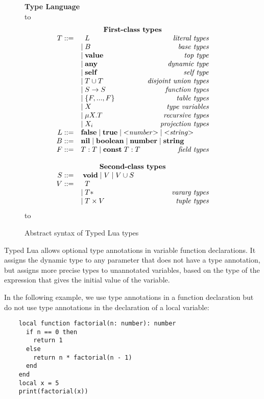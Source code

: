 \documentclass{sig-alternate}
\newcommand{\Any}{\mathbf{any}}
\newcommand{\Top}{\mathbf{value}}
\newcommand{\Nil}{\mathbf{nil}}
\newcommand{\False}{\mathbf{false}}
\newcommand{\True}{\mathbf{true}}
\newcommand{\Boolean}{\mathbf{boolean}}
\newcommand{\Number}{\mathbf{number}}
\newcommand{\String}{\mathbf{string}}
\newcommand{\Void}{\mathbf{void}}
\newcommand{\Const}{\mathbf{const}}
\newcommand{\Self}{\mathbf{self}}
\def\dstart{\hbox to \hsize{\vrule depth 4pt\hrulefill\vrule depth 4pt}}
\def\dend{\hbox to \hsize{\vrule height 4pt\hrulefill\vrule height 4pt}}
\begin{document}
\begin{figure}[!ht]
\textbf{Type Language}\\
\dstart
$$
\begin{array}{rlr}
\multicolumn{3}{c}{\textbf{First-class types}} \\
T ::= & \;\; L & \textit{literal types}\\
& | \; B & \textit{base types}\\
& | \; \Top & \textit{top type}\\
& | \; \Any & \textit{dynamic type}\\
& | \; \Self & \textit{self type}\\
& | \; T \cup T & \textit{disjoint union types}\\
& | \; S \rightarrow S & \textit{function types}\\
& | \; \{F, ..., F\} & \textit{table types}\\
& | \; X & \textit{type variables}\\
& | \; \mu X.T & \textit{recursive types}\\
& | \; X_i & \textit{projection types}\\
L ::= & \multicolumn{2}{l}{\False \; | \; \True \; | \; {<}{\it number}{>} \; | \; {<}{\it string}{>} } \\
B ::= & \multicolumn{2}{l}{\Nil \; | \; \Boolean \; | \; \Number \; | \; \String} \\
F ::= & T:T \; | \; \Const \; T:T & \textit{field types} \\
\multicolumn{3}{c}{} \\
\multicolumn{3}{c}{\textbf{Second-class types}} \\
S ::= &  \multicolumn{2}{l}{\; \Void \; | \; V \; | \; V \cup S} \\
V ::= & \;\; T & \\
& | \; T* & \textit{vararg types}\\
& | \; T \times V & \textit{tuple types}
\end{array}
$$
\dend
\caption{Abstract syntax of Typed Lua types}
\label{fig:typelang}
\end{figure}

Typed Lua allows optional type annotations in variable function
declarations. It assigns the dynamic type to any parameter that
does not have a type annotation, but assigns more precise
types to unannotated variables, based on the type of the
expression that gives the initial value of the variable.

In the following example, we use type annotations in a function
declaration but do not use type annotations in the declaration
of a local variable:
\begin{verbatim}
    local function factorial(n: number): number
      if n == 0 then
        return 1
      else
        return n * factorial(n - 1)
      end
    end
    local x = 5
    print(factorial(x))
\end{verbatim}
\end{document}
